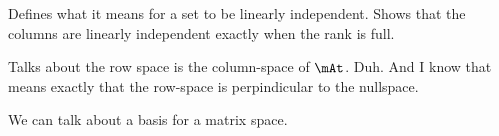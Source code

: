 Defines what it means for a set to be linearly independent. Shows that
the columns are linearly independent exactly when the rank is full.

Talks about the row space is the column-space of $\mAt$. Duh. And I know
that means exactly that the row-space is perpindicular to the nullspace.

We can talk about a basis for a matrix space.
